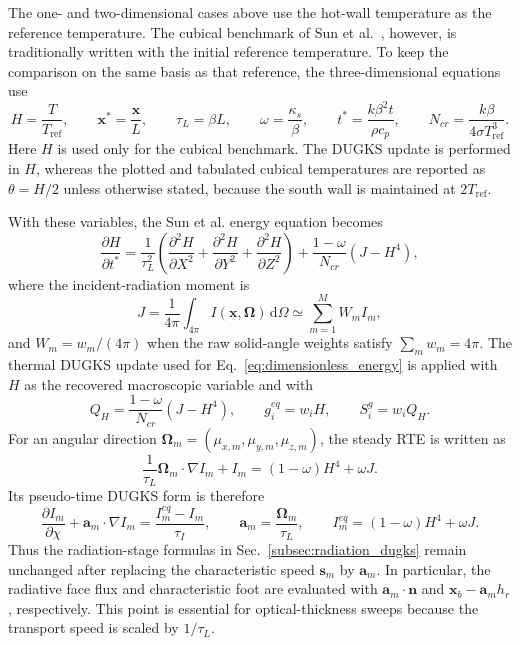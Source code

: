 \documentclass[a4paper,12pt]{ctexart}
\numberwithin{equation}{section}
\newcommand{\vb}[1]{\bm{#1}}
\newcommand{\vx}{\vb{x}}
\newcommand{\vn}{\vb{n}}
\newcommand{\vs}{\vb{s}}
\newcommand{\dd}{\mathrm{d}}
\begin{document}
The one- and two-dimensional cases above use the hot-wall temperature as the reference temperature. The cubical benchmark of Sun et al.~\cite{SunMaLi2012}, however, is traditionally written with the initial reference temperature. To keep the comparison on the same basis as that reference, the three-dimensional equations use
\begin{equation*}
H=\frac{T}{T_{\mathrm{ref}}},\qquad
\vx^*=\frac{\vx}{L},\qquad
\tau_L=\beta L,
\qquad
\omega=\frac{\kappa_s}{\beta},
\qquad
t^*=\frac{k\beta^2t}{\rho c_p},
\qquad
N_{cr}=\frac{k\beta}{4\sigma T_{\mathrm{ref}}^3}.
\end{equation*}
Here $H$ is used only for the cubical benchmark. The DUGKS update is performed in $H$, whereas the plotted and tabulated cubical temperatures are reported as $\theta=H/2$ unless otherwise stated, because the south wall is maintained at $2T_{\mathrm{ref}}$.

With these variables, the Sun et al. energy equation becomes
\begin{equation}
\frac{\partial H}{\partial t^*}
=
\frac{1}{\tau_L^2}
\left(
\frac{\partial^2H}{\partial X^2}
+\frac{\partial^2H}{\partial Y^2}
+\frac{\partial^2H}{\partial Z^2}
\right)
+\frac{1-\omega}{N_{cr}}\left(J-H^4\right),
\label{eq:3d_energy_sun}
\end{equation}
where the incident-radiation moment is
\begin{equation*}
J=\frac{1}{4\pi}\int_{4\pi}I(\vx,\vb{\Omega})\,\dd\Omega
\simeq \sum_{m=1}^{M}W_m I_m,
\end{equation*}
and $W_m=w_m/(4\pi)$ when the raw solid-angle weights satisfy $\sum_m w_m=4\pi$. The thermal DUGKS update used for Eq.~\eqref{eq:dimensionless_energy} is applied with $H$ as the recovered macroscopic variable and with
\begin{equation*}
Q_H=\frac{1-\omega}{N_{cr}}\left(J-H^4\right),
\qquad
g_i^{eq}=w_iH,\qquad
S_i^g=w_iQ_H.
\end{equation*}
For an angular direction $\vb{\Omega}_m=(\mu_{x,m},\mu_{y,m},\mu_{z,m})$, the steady RTE is written as
\begin{equation*}
\frac{1}{\tau_L}\vb{\Omega}_m\cdot\nabla I_m+I_m
=
(1-\omega)H^4+\omega J.
\end{equation*}
Its pseudo-time DUGKS form is therefore
\begin{equation*}
\frac{\partial I_m}{\partial \chi}
+
\vb{a}_m\cdot\nabla I_m
=
\frac{I_m^{eq}-I_m}{\tau_I},
\qquad
\vb{a}_m=\frac{\vb{\Omega}_m}{\tau_L},
\qquad
I_m^{eq}=(1-\omega)H^4+\omega J.
\end{equation*}
Thus the radiation-stage formulas in Sec.~\ref{subsec:radiation_dugks} remain unchanged after replacing the characteristic speed $\vs_m$ by $\vb{a}_m$. In particular, the radiative face flux and characteristic foot are evaluated with $\vb{a}_m\cdot\vn$ and $\vx_b-\vb{a}_m h_r$, respectively. This point is essential for optical-thickness sweeps because the transport speed is scaled by $1/\tau_L$.
\end{document}
